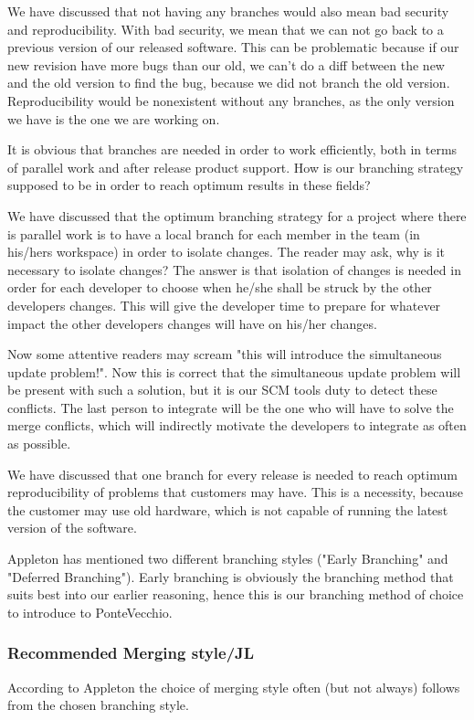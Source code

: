 \documentclass[10pt]{article}
\begin{document}
\noindent We have discussed that not having any branches would also mean bad security and reproducibility. With bad security, we mean that we can not go back to a previous version of our released software. This can be problematic because if our new revision have more bugs than our old, we can't do a diff between the new and the old version to find the bug, because we did not branch the old version. Reproducibility would be nonexistent without any branches, as the only version we have is the one we are working on.

\noindent It is obvious that branches are needed in order to work efficiently, both in terms of parallel work and after release product support. How is our branching strategy supposed to be in order to reach optimum results in these fields?

\noindent We have discussed that the optimum branching strategy for a project where there is parallel work is to have a local branch for each member in the team (in his/hers workspace) in order to isolate changes. The reader may ask, why is it necessary to isolate changes? The answer is that isolation of changes is needed in order for each developer to choose when he/she shall be struck by the other developers changes. This will give the developer time to prepare for whatever impact the other developers changes will have on his/her changes.

\noindent Now some attentive readers may scream "this will introduce the simultaneous update problem!". Now this is correct that the simultaneous update problem will be present with such a solution, but it is our SCM tools duty to detect these conflicts. The last person to integrate will be the one who will have to solve the merge conflicts, which will indirectly motivate the developers to integrate as often as possible.

\noindent We have discussed that one branch for every release is needed to reach optimum reproducibility of problems that customers may have. This is a necessity, because the customer may use old hardware, which is not capable of running the latest version of the software.

\noindent Appleton \cite{Appleton} has mentioned two different branching styles ("Early Branching" and "Deferred Branching"). Early branching is obviously the branching method that suits best into our earlier reasoning, hence this is our branching method of choice to introduce to PonteVecchio. 

\subsubsection{Recommended Merging style/JL}
\noindent According to Appleton \cite{Appleton} the choice of merging style often (but not always) follows from the chosen branching style.
\end{document}
